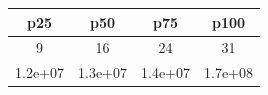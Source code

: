 \documentclass[]{book}
\theoremstyle{definition}
\theoremstyle{definition}
\theoremstyle{definition}
\theoremstyle{remark}
\begin{document}
\begin{longtable}[]{@{}cccc@{}}
\toprule
\begin{minipage}[b]{0.12\columnwidth}\centering\strut
p25\strut
\end{minipage} & \begin{minipage}[b]{0.12\columnwidth}\centering\strut
p50\strut
\end{minipage} & \begin{minipage}[b]{0.12\columnwidth}\centering\strut
p75\strut
\end{minipage} & \begin{minipage}[b]{0.12\columnwidth}\centering\strut
p100\strut
\end{minipage}\tabularnewline
\midrule
\endhead
\begin{minipage}[t]{0.12\columnwidth}\centering\strut
9\strut
\end{minipage} & \begin{minipage}[t]{0.12\columnwidth}\centering\strut
16\strut
\end{minipage} & \begin{minipage}[t]{0.12\columnwidth}\centering\strut
24\strut
\end{minipage} & \begin{minipage}[t]{0.12\columnwidth}\centering\strut
31\strut
\end{minipage}\tabularnewline
\begin{minipage}[t]{0.12\columnwidth}\centering\strut
1.2e+07\strut
\end{minipage} & \begin{minipage}[t]{0.12\columnwidth}\centering\strut
1.3e+07\strut
\end{minipage} & \begin{minipage}[t]{0.12\columnwidth}\centering\strut
1.4e+07\strut
\end{minipage} & \begin{minipage}[t]{0.12\columnwidth}\centering\strut
1.7e+08\strut
\end{minipage}\tabularnewline
\bottomrule
\end{longtable}
\end{document}
